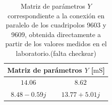 \begin{table}[H]
\centering
\begin{tabular}{|c|c|}
\hline
\multicolumn{2}{|c|}{\textbf{Matriz de parámetros $Y$  [$\mathrm{mS}$]}} \\ \hline
$14.06\, $ & $8.62\, $ \\ \hline
$8.48 - 0.59j\, $ & $13.77 + 5.01 j\,$ \\ \hline
\end{tabular}
\caption{Matriz de parámetros $Y$ correspondiente a la conexión en paralelo de los cuadripolos 9603 y 9609, obtenida directamente a partir de los valores medidos en el laboratorio.(falta checkear)}
\label{tab:matriz_Y_paralelo_directa}
\end{table}


